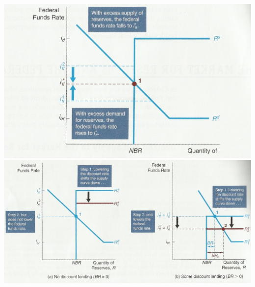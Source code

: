 \documentclass[12pt]{examnotes}
\begin{document}
\begin{center}
  \includegraphics[scale=0.4]{./imgs/chapter16fig1.jpg}
  \includegraphics[scale=0.5]{./imgs/chapter16fig3.jpg}
\end{center}
\end{document}
